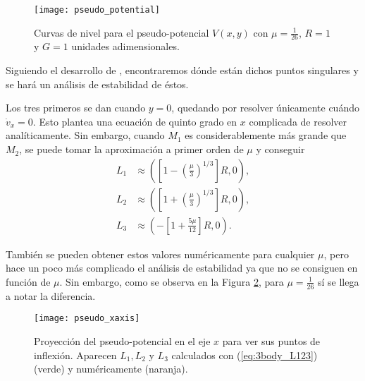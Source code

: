\begin{figure}[h!]
 \centering
 \texttt{[image: pseudo\_potential]}
 \caption{Curvas de nivel para el pseudo-potencial $V(x,y)$ con $\mu = \frac{1}{26}$, $R=1$ y $G=1$ unidades adimensionales.}
 \label{fig:3body_pseudo_potential}
\end{figure}

Siguiendo el desarrollo de \cite{Cornish1998, Widnall2008}, encontraremos dónde están dichos puntos singulares y se hará un análisis de estabilidad de éstos.

Los tres primeros se dan cuando $y=0$, quedando por resolver únicamente cuándo $\dot{v}_x = 0$. Esto plantea una ecuación de quinto grado en $x$ complicada de resolver analíticamente. Sin embargo, cuando $M_1$ es considerablemente más grande que $M_2$, se puede tomar la aproximación a primer orden de $\mu$ y conseguir
\begin{align}
 L_1 &\approx \left( \left[ 1 - \left(\frac{\mu}{3}\right)^{1/3} \right] R , 0 \right) \nonumber, \\ 
 L_2 &\approx \left( \left[ 1 + \left(\frac{\mu}{3}\right)^{1/3} \right] R , 0 \right) \nonumber, \\
 L_3 &\approx \left( -\left[ 1 + \frac{5 \mu}{12} \right] R, 0 \right).
 \label{eq:3body_L123}
\end{align} 

También se pueden obtener estos valores numéricamente para cualquier $\mu$, pero hace un poco más complicado el análisis de estabilidad ya que no se consiguen en función de $\mu$. Sin embargo, como se observa en la Figura \ref{fig:3body_pseudo_xaxis}, para $\mu = \frac{1}{26}$ sí se llega a notar la diferencia.

\begin{figure}[h!]
 \centering
 \texttt{[image: pseudo\_xaxis]}
 \caption{Proyección del pseudo-potencial en el eje $x$ para ver sus puntos de inflexión. Aparecen $L_1, L_2$ y $L_3$ calculados con (\ref{eq:3body_L123}) (verde) y numéricamente (naranja).}
 \label{fig:3body_pseudo_xaxis}
\end{figure}

